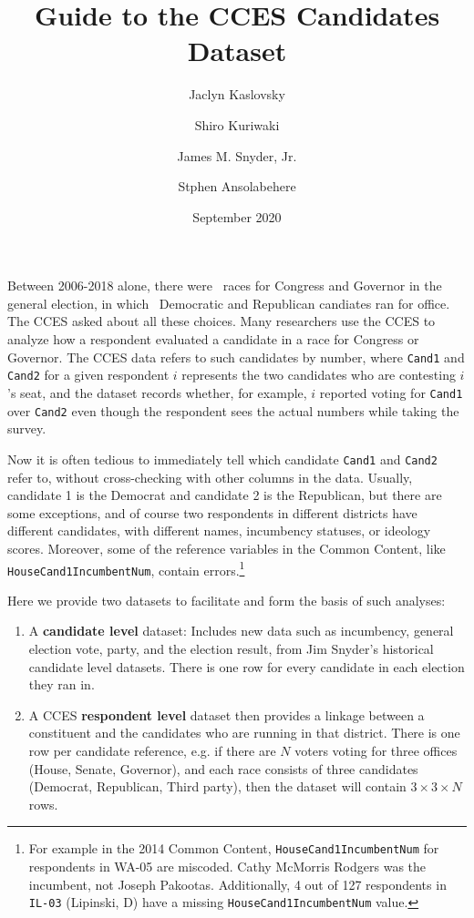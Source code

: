 \documentclass[12pt]{article}
\title{\large\textbf{Guide to the CCES Candidates Dataset}}
\author[1]{\normalsize Jaclyn Kaslovsky}
\author[2]{\normalsize Shiro Kuriwaki}
\author[2]{\normalsize James M. Snyder, Jr.}
\author[2]{\normalsize Stphen Ansolabehere}
\affil[1]{\footnotesize Center for the Study of Democratic Politics, Princeton University.}
\affil[2]{\footnotesize Department of Government, Harvard University.}
\date{\normalsize September 2020}
\begin{document}
\maketitle 


Between 2006-2018 alone, there were \unskip \ races for Congress and Governor in the general election, in which \unskip \ Democratic and Republican candiates ran for office. The CCES asked about all these choices. Many researchers use the CCES to analyze how a respondent evaluated a candidate in a race for Congress or Governor. The CCES data refers to such candidates by number, where \texttt{Cand1} and \texttt{Cand2}  for a given respondent \(i\) represents the two candidates who are contesting \(i\)'s seat, and the dataset records whether, for example, \(i\) reported voting for \texttt{Cand1} over \texttt{Cand2} even though the respondent sees the actual numbers while taking the survey.  


Now it is often tedious to immediately tell which candidate \texttt{Cand1} and \texttt{Cand2} refer to, without cross-checking with other columns in the data. Usually, candidate 1 is the Democrat and candidate 2 is the Republican, but there are some exceptions, and of course two respondents in different districts have different candidates, with different names, incumbency statuses, or ideology scores. Moreover, some of the reference variables in the Common Content, like \texttt{HouseCand1IncumbentNum}, contain errors.\footnote{For example in the 2014 Common Content, \texttt{HouseCand1IncumbentNum} for respondents in WA-05 are miscoded. Cathy McMorris Rodgers was the incumbent, not Joseph Pakootas. Additionally, 4 out of 127 respondents in \texttt{IL-03} (Lipinski, D) have a missing \texttt{HouseCand1IncumbentNum} value.}

\noindent Here we provide two datasets to facilitate and form the basis of such analyses:
\begin{enumerate}
\item A \textbf{candidate level} dataset: Includes new data such as incumbency, general election vote, party, and the election result, from Jim Snyder's historical candidate level datasets. There is one row for every candidate in each election they ran in. 
\item A CCES \textbf{respondent level} dataset then provides a linkage between a constituent and the candidates who are running in that district. There is one row per candidate reference, e.g. if there are $N$ voters voting for three offices (House, Senate, Governor), and each race consists of three candidates (Democrat, Republican, Third party), then the dataset will contain $3\times3\times N$ rows.
\end{enumerate}
\end{document}
